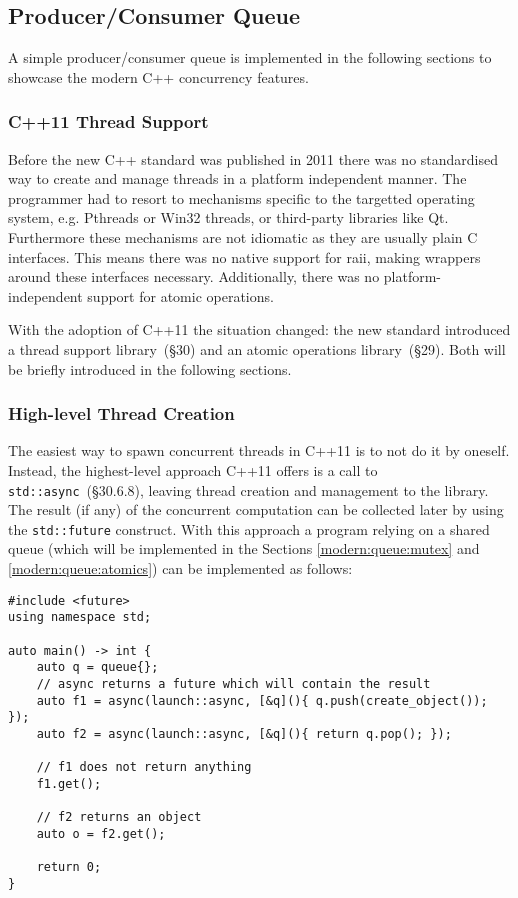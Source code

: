 \subsection{Producer/Consumer Queue}\label{modern:queue}

A simple producer/consumer queue is implemented in the following sections to showcase the modern C++ concurrency features.

\subsubsection{C++11 Thread Support}\label{modern:queue:support}

Before the new C++ standard was published in 2011 there was no standardised way to create and manage threads in a platform independent manner. The programmer had to resort to mechanisms specific to the targetted operating system, e.g. Pthreads or Win32 threads, or third-party libraries like Qt. Furthermore these mechanisms are not idiomatic as they are usually plain C interfaces. This means there was no native support for \gls{raii}, making wrappers around these interfaces necessary. Additionally, there was no platform-independent support for atomic operations.

With the adoption of C++11 the situation changed: the new standard introduced a thread support library~\cite{cpp11std}(§30) and an atomic operations library~\cite{cpp11std}(§29). Both will be briefly introduced in the following sections.

\subsubsection{High-level Thread Creation}\label{modern:queue:futures}

The easiest way to spawn concurrent threads in C++11 is to not do it by oneself. Instead, the highest-level approach C++11 offers is a call to \texttt{std::async}~\cite{cpp11std}(§30.6.8), leaving thread creation and management to the library. The result (if any) of the concurrent computation can be collected later by using the \texttt{std::future} construct. With this approach a program relying on a shared queue (which will be implemented in the Sections \ref{modern:queue:mutex} and \ref{modern:queue:atomics}) can be implemented as follows:

\begin{verbatim}
#include <future>
using namespace std;

auto main() -> int {
    auto q = queue{};
    // async returns a future which will contain the result
    auto f1 = async(launch::async, [&q](){ q.push(create_object()); });
    auto f2 = async(launch::async, [&q](){ return q.pop(); });
 
    // f1 does not return anything
    f1.get();

    // f2 returns an object
    auto o = f2.get();

    return 0;
}
\end{verbatim}


